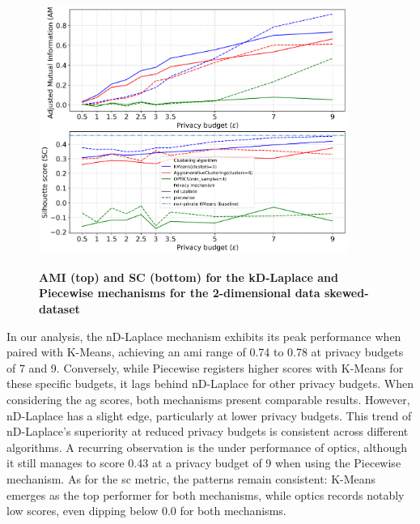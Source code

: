 \newpage
\begin{figure}[H]
  \centering
  \caption{\textbf{AMI (top) and SC (bottom) for the kD-Laplace and Piecewise mechanisms for the 2-dimensional data skewed-dataset}}
  \includegraphics[width=0.9\textwidth]{Results/nd-laplace/nd-Laplace/skewed-dataset/ami-and-sc_2_dimensions.png}
  \label{fig:validation-skewed-dataset_comparison_2d-laplace}
\end{figure}
In our analysis, the nD-Laplace mechanism exhibits its peak performance when paired with K-Means, achieving an \gls{ami} range of 0.74 to 0.78 at privacy budgets of 7 and 9. Conversely, while Piecewise registers higher scores with K-Means for these specific budgets, it lags behind nD-Laplace for other privacy budgets. When considering the \gls{ag} scores, both mechanisms present comparable results. However, nD-Laplace has a slight edge, particularly at lower privacy budgets. This trend of nD-Laplace's superiority at reduced privacy budgets is consistent across different algorithms. A recurring observation is the under performance of \gls{optics}, although it still manages to score 0.43 at a privacy budget of 9 when using the Piecewise mechanism. As for the \gls{sc} metric, the patterns remain consistent: K-Means emerges as the top performer for both mechanisms, while \gls{optics} records notably low scores, even dipping below 0.0 for both mechanisms.

\newpage

